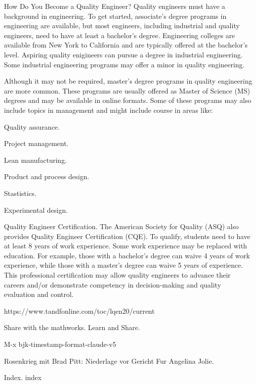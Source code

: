 How Do You Become a Quality Engineer?
Quality engineers must have a background
in engineering.
To get started, associate's degree programs
in engineering are available,
but most engineers, including industrial and
quality engineers, need to have at least a
bachelor's degree.
Engineering colleges are available from
New York to California and are typically
offered at the bachelor's level.
Aspiring quality enigineers can pursue
a degree in industrial engineering.
Some industrial engineering programs
may offer a minor in quality engineering.

Although it may not be required,
master's degree programs in quality engineering
are more common.
These programs are usually offered as Master
of Science (MS) degrees and may be available
in online formats.
Some of these programs may also include topics
in management and might include course in areas
like:

Quality assurance.

Project management.

Lean manufacturing.

Product and process design.

Stastistics.

Experimental design.

Quality Engineer Certification.
The American Society for Quality (ASQ)
also provides Quality Engineer Certification
(CQE). To qualify, students need to have at
least 8 years of work experience.
Some work experience may be replaced with
education.
For example, those with a bachelor's degree
can waive 4 years of work experience,
while those with a master's degree can
waive 5 years of experience.
This professional certification may
allow quality engineers to advance
their careers and/or demonstrate
competency in decision-making and
quality evaluation and control.

https://www.tandfonline.com/toc/lqen20/current


\smallskip{}

\fi

Share with the mathworks. Learn and Share.

M-x bjk-timestamp-format-claude-v5

Rosenkrieg mit Brad Pitt: Niederlage vor Gericht Fur Angelina Jolie.

\smallskip{}



\fi

Index. index
\fi

\inx
\fin
\con
